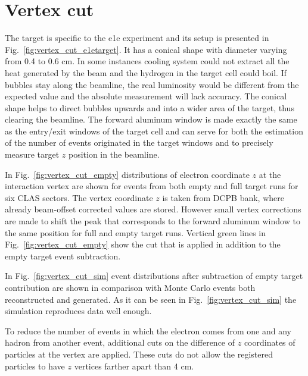 \section{Vertex cut}
\label{vertex_cut}

The target is specific to the e1e experiment and its setup is presented in Fig.~\ref{fig:vertex_cut_e1etarget}. It has a conical shape with diameter varying from 0.4 to 0.6 cm. In some instances cooling system could not extract all the heat generated by the beam and the hydrogen in the target cell could boil. If bubbles stay along the beamline, the real luminosity would be different from the expected value and the absolute measurement will lack accuracy. The conical shape helps to direct bubbles upwards and into a wider area of the target, thus clearing the beamline. The forward aluminum window is made exactly the same as the entry/exit windows of the target cell and can serve for both  the estimation of the number of events originated in the target windows and to precisely measure target $z$ position in the beamline.

In Fig.~\ref{fig:vertex_cut_empty} distributions of electron coordinate $z$ at the interaction vertex are shown for events from both empty and full target runs for six CLAS sectors. The vertex coordinate $z$ is taken from DCPB bank, where already beam-offset corrected values are stored. However small vertex corrections are made to shift the peak that corresponds to the forward aluminum window to the same position for full and empty target runs. Vertical green lines in Fig.~\ref{fig:vertex_cut_empty} show the cut that is applied in addition to the empty target event subtraction. 

In Fig.~\ref{fig:vertex_cut_sim} event distributions after subtraction of empty target contribution are shown in comparison with Monte Carlo events both reconstructed and generated. As it can be seen in Fig.~\ref{fig:vertex_cut_sim} the simulation reproduces data well enough.

 To reduce the number of events  in which the electron comes from one and any hadron from another event, additional cuts on the difference of $z$ coordinates of particles at the vertex are applied. These cuts do not allow the registered particles to have $z$ vertices farther apart than 4 cm. 

